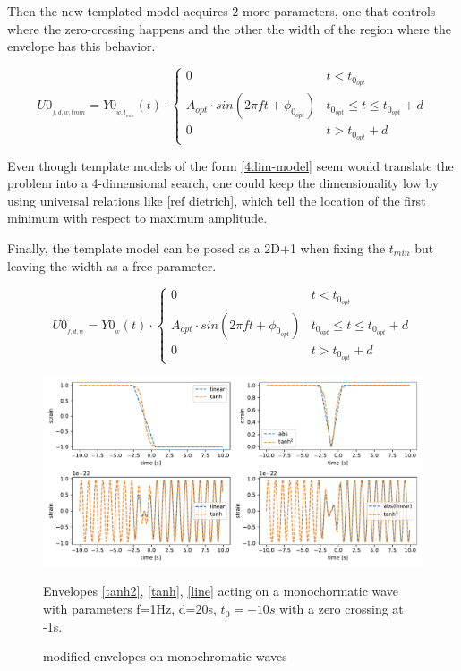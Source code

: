 Then the new templated model acquires 2-more parameters, one that controls where the zero-crossing happens and the other the width of the region where the envelope has this behavior.

\begin{equation}\label{4dim-model}
U0_{_{f,d, w, tmin}} = Y0_{_{w,t_{min}}}(t) \cdot
\begin{cases} 
      0 & t<t_{0_{opt}} \\
      A_{opt} \cdot sin(2\pi f t + \phi_{0_{opt}}) & t_{0_{opt}} \leq t\leq t_{0_{opt}}+d \\
      0 & t>t_{0_{opt}}+d
   \end{cases}
\end{equation}


Even though template models of the form \ref{4dim-model} seem would translate the problem into a 4-dimensional search, one could keep the dimensionality low by using universal relations like [ref dietrich], which tell the location of the first minimum with respect to maximum amplitude. 

Finally, the template model can be posed as a 2D+1 when fixing the $t_{min}$ but leaving the width as a free parameter.

\begin{equation}\label{3dim-model}
U0_{_{f,d, w}} = Y0_{_{w}}(t) \cdot
\begin{cases} 
      0 & t<t_{0_{opt}} \\
      A_{opt} \cdot sin(2\pi f t + \phi_{0_{opt}}) & t_{0_{opt}} \leq t\leq t_{0_{opt}}+d \\
      0 & t>t_{0_{opt}}+d
   \end{cases}
\end{equation}

\begin{figure}[hbt!]
\begin{center}
\includegraphics[width=\textwidth, angle=0]{images/Data_analysis/results/envel.pdf}
\caption{modified envelopes on monochromatic waves}
\label{env.ex}
\end{center}
Envelopes \ref{tanh2}, \ref{tanh}, \ref{line} acting on a monochormatic wave with parameters f=1Hz, d=20s, $t_{0}=-10s$ with a zero crossing at -1s.
\end{figure}
\FloatBarrier

